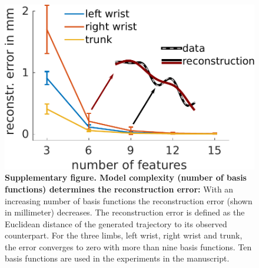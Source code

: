 
\begin{figure}
\centering
\includegraphics[width=.5\textwidth]{Elmar/picsSupp/NumGaussianFeatures}
 \caption{\textbf{Supplementary figure. Model complexity (number of basis functions) determines the reconstruction error:}  
 With an increasing number of basis functions the reconstruction error (shown in millimeter) decreases. 
 The reconstruction error is defined as the Euclidean distance of the generated trajectory to its observed counterpart. 
 For the three limbs, left wrist, right wrist and trunk, the error converges to zero with more than nine basis functions. 
 Ten basis functions are used in the experiments in the manuscript. 
}
\label{fig:subFigNumGaussians}
\end{figure}

